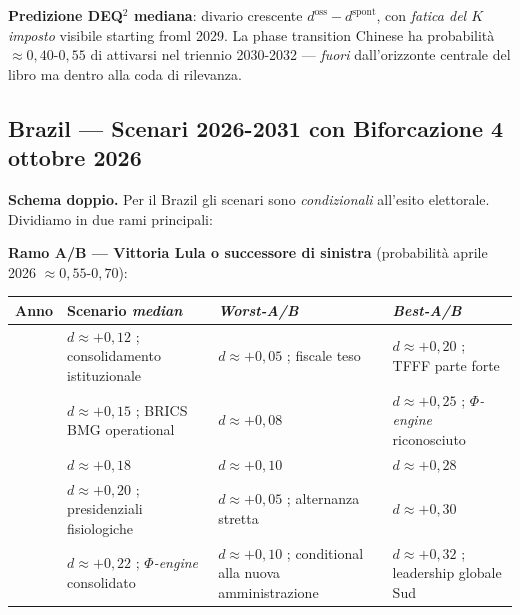 \Conj{} \textbf{Predizione DEQ$^2$ mediana}: divario crescente
\(d^{\text{oss}} - d^{\text{spont}}\), con \emph{fatica del \(K\)
imposto} visibile starting froml 2029. La phase transition Chinese ha
probabilità \(\approx 0{,}40\)-\(0{,}55\) di attivarsi nel triennio
2030-2032 --- \emph{fuori} dall'orizzonte centrale del libro ma dentro
alla coda di rilevanza.

\subsection{Brazil --- Scenari 2026-2031 con Biforcazione 4 ottobre
2026}\label{brasile-scenari-2026-2031-con-bifurcation-4-ottobre-2026}

\Hypoth{} \textbf{Schema doppio.} Per il Brazil gli scenari sono
\emph{condizionali} all'esito elettorale. Dividiamo in due rami
principali:

\textbf{Ramo A/B --- Vittoria Lula o successore di sinistra}
(probabilità aprile 2026 \(\approx 0{,}55\)-\(0{,}70\)):

{\def\LTcaptype{none} %
{\small\begin{longtable}[]{@{}
  >{\raggedright\arraybackslash}p{}
  >{\raggedright\arraybackslash}p{}
  >{\raggedright\arraybackslash}p{}
  >{\raggedright\arraybackslash}p{}@{}}
\toprule\noalign{}
\begin{minipage}[b]{\linewidth}\raggedright
Anno
\end{minipage} & \begin{minipage}[b]{\linewidth}\raggedright
Scenario \emph{median}
\end{minipage} & \begin{minipage}[b]{\linewidth}\raggedright
\emph{Worst-A/B}
\end{minipage} & \begin{minipage}[b]{\linewidth}\raggedright
\emph{Best-A/B}
\end{minipage} \\
\midrule\noalign{}
\endhead
\bottomrule\noalign{}
\endlastfoot
2027 & \(d \approx +0{,}12\) ; consolidamento istituzionale &
\(d \approx +0{,}05\) ; fiscale teso & \(d \approx +0{,}20\) ; TFFF
parte forte \\
2028 & \(d \approx +0{,}15\) ; BRICS BMG operational &
\(d \approx +0{,}08\) & \(d \approx +0{,}25\) ; \emph{$\Phi$-engine}
riconosciuto \\
2029 & \(d \approx +0{,}18\) & \(d \approx +0{,}10\) &
\(d \approx +0{,}28\) \\
2030 & \(d \approx +0{,}20\) ; presidenziali fisiologiche &
\(d \approx +0{,}05\) ; alternanza stretta & \(d \approx +0{,}30\) \\
2031 & \(d \approx +0{,}22\) ; \emph{$\Phi$-engine} consolidato &
\(d \approx +0{,}10\) ; conditional alla nuova amministrazione &
\(d \approx +0{,}32\) ; leadership globale Sud \\
\end{longtable}}
}

